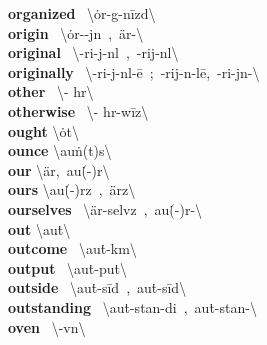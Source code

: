\documentclass[10pt,a4paper]{article}
\begin{document}
\begin{multicols}{2}
\textbf{ organized }\quad \ \textbackslash \textprimstress \.{o}r-g\textschwa -\textsecstress n\={i}zd\textbackslash \\
\textbf{ origin }\quad \ \textbackslash \textprimstress \.{o}r-\textschwa -j\textschwa n\ ,\ \textprimstress \"{a}r-\textbackslash \\
\textbf{ original }\quad \ \textbackslash \textschwa -\textprimstress ri-j\textschwa -n\textsuperscript{\textreve}l\ ,\ -\textprimstress rij-n\textschwa l\textbackslash \\
\textbf{ originally }\quad \ \textbackslash \textschwa -\textprimstress ri-j\textschwa -n\textsuperscript{\textreve}l-\={e}\ ;\ -\textprimstress rij-n\textschwa -l\={e},\ -\textprimstress ri-j\textschwa n-\textbackslash \\
\textbf{ other }\quad \ \textbackslash \textprimstress \textschwa - h\textschwa r\textbackslash \\
\textbf{ otherwise }\quad \ \textbackslash \textprimstress \textschwa - h\textschwa r-\textsecstress w\={i}z\textbackslash \\
\textbf{ ought }\quad \textbackslash \textprimstress \.{o}t\textbackslash \\
\textbf{ ounce }\quad \textbackslash \textprimstress au\. n(t)s\textbackslash \\
\textbf{ our }\quad \textbackslash \"{a}r,\ \textprimstress au\. (-\textschwa )r\textbackslash \\
\textbf{ ours }\quad \textbackslash \textprimstress au\. (-\textschwa )rz\ ,\ \"{a}rz\textbackslash \\
\textbf{ ourselves }\quad \ \textbackslash \"{a}r-\textprimstress selvz\ ,\ au\. (-\textschwa )r-\textbackslash \\
\textbf{ out }\quad \textbackslash \textprimstress au\. t\textbackslash \\
\textbf{ outcome }\quad \ \textbackslash \textprimstress au\. t-\textsecstress k\textschwa m\textbackslash \\
\textbf{ output }\quad \ \textbackslash \textprimstress au\. t-\textsecstress pu\. t\textbackslash \\
\textbf{ outside }\quad \ \textbackslash \textsecstress au\. t-\textprimstress s\={i}d\ ,\ \textprimstress au\. t-\textsecstress s\={i}d\textbackslash \\
\textbf{ outstanding }\quad \ \textbackslash au\. t-\textprimstress stan-di\engma \ ,\ \textprimstress au\. t-\textsecstress stan-\textbackslash \\
\textbf{ oven }\quad \ \textbackslash \textprimstress \textschwa -v\textschwa n\textbackslash \\

\end{multicols}
\end{document}
